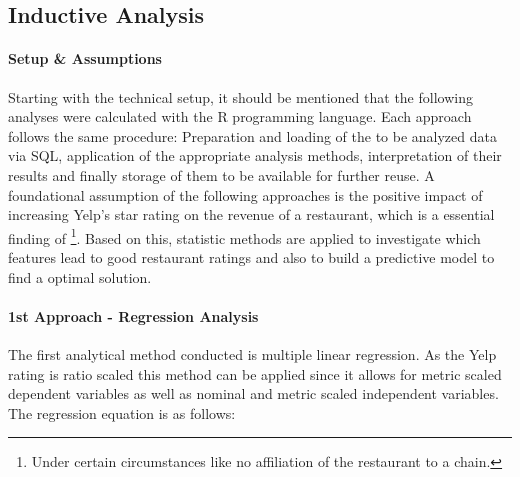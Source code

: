 \subsection{Inductive Analysis}
\label{subsec:analysis}


\paragraph{Setup \& Assumptions}
Starting with the technical setup, it should be mentioned that the following analyses were calculated with the R programming language. Each approach follows the same procedure: Preparation and loading of the to be analyzed data via SQL, application of the appropriate analysis methods, interpretation of their results and finally storage of them to be available for further reuse.\newline
A foundational assumption of the following approaches is the positive impact of increasing Yelp's star rating on the revenue of a restaurant, which is a essential finding of \cite{CaseOfYelp}\footnote{Under certain circumstances like no affiliation of the restaurant to a chain.}. Based on this, statistic methods are applied to investigate which features lead to good restaurant ratings and also to build a predictive model to find a optimal solution.


\paragraph{1st Approach -  Regression Analysis}
The first analytical method conducted is multiple linear regression. As the Yelp rating is ratio scaled this method can be applied since it allows for metric scaled dependent variables as well as nominal and metric scaled independent variables. The regression equation is as follows: 

